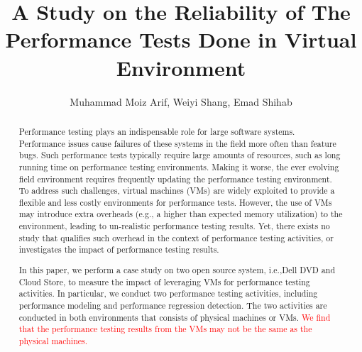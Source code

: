 \documentclass[review]{elsarticle}
\begin{document}
	
	\begin{frontmatter}
		
		\title{A Study on the Reliability of The Performance Tests Done in Virtual Environment}
		
		\author{Muhammad Moiz Arif, Weiyi Shang, Emad Shihab}%
		\address{Concordia University, Montreal, Quebec}
		
		
		
		
		\begin{abstract}
			Performance testing plays an indispensable role for large software systems. Performance issues cause failures of these systems in the field more often than feature bugs. Such performance tests typically require large amounts of resources, such as long running time on performance testing environments. Making it worse, the ever evolving field environment requires frequently updating the performance testing environment. To address such challenges, virtual machines (VMs) are widely exploited to provide a flexible and less costly environments for performance tests. However, the use of VMs may introduce extra overheads (e.g., a higher than expected memory utilization) to the environment, leading to un-realistic performance testing results. Yet, there exists no study that qualifies such overhead in the context of performance testing activities, or investigates the impact of performance testing results. 
			
			In this paper, we perform a case study on two open source system, i.e.,Dell DVD and Cloud Store, to measure the impact of leveraging VMs for performance testing activities. In particular, we conduct two performance testing activities, including performance modeling and performance regression detection. The two activities are conducted in both environments that consists of physical machines or VMs. \textcolor{red}{We find that the performance testing results from the VMs may not be the same as the physical machines.}
			

\end{abstract}
\end{frontmatter}
\end{document}
